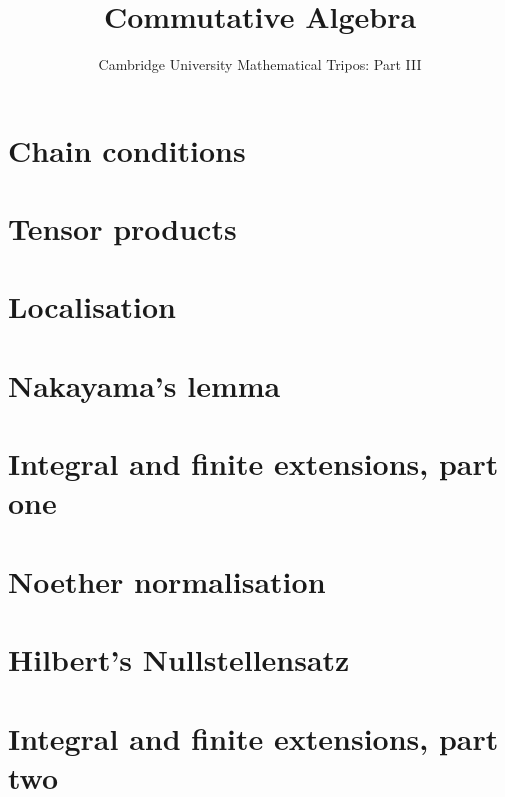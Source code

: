 \documentclass{article}
\title{Commutative Algebra}
\author{Cambridge University Mathematical Tripos: Part III}
\begin{document}
\maketitle

\tableofcontentsnewpage{}

\section{Chain conditions}

\section{Tensor products}

\section{Localisation}

\section{Nakayama's lemma}

\section{Integral and finite extensions, part one}

\section{Noether normalisation}

\section{Hilbert's Nullstellensatz}

\section{Integral and finite extensions, part two}

\end{document}

